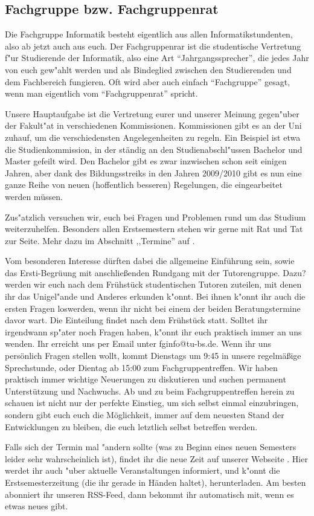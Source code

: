 \subsection{Fachgruppe bzw. Fachgruppenrat}

Die Fachgruppe Informatik besteht eigentlich aus allen 
Informatikstundenten, also ab jetzt auch aus euch. Der Fachgruppenrar 
ist die studentische Vertretung f"ur Studierende der Informatik, also 
eine Art "`Jahrgangssprecher"', die jedes Jahr von euch gew"ahlt werden 
und als Bindeglied zwischen den Studierenden und dem Fachbereich 
fungieren. Oft wird aber auch einfach "`Fachgruppe"' gesagt, wenn man 
eigentlich vom "`Fachgruppenrat"' spricht.

Unsere Hauptaufgabe ist die Vertretung eurer und unserer Meinung 
gegen"uber der Fakult"at in verschiedenen Kommissionen. Kommissionen 
gibt es an der Uni zuhauf, um die verschiedensten Angelegenheiten zu 
regeln. Ein Beispiel ist etwa die Studienkommission, in der ständig 
an den Studienabschl"ussen Bachelor und Master gefeilt wird. Den Bachelor 
gibt es zwar inzwischen schon seit einigen Jahren, aber dank des 
Bildungsstreiks in den Jahren 2009/2010 gibt es nun eine ganze Reihe 
von neuen (hoffentlich besseren) Regelungen, die eingearbeitet werden 
müssen.

Zus"atzlich versuchen wir, euch bei Fragen und Problemen rund um das 
Studium weiterzuhelfen. Besonders allen Erstsemestern stehen wir 
gerne mit Rat und Tat zur Seite.  Mehr dazu im Abschnitt ,,Termine'' auf
\pageref{termine}.

Vom besonderen Interesse dürften dabei die allgemeine Einführung sein,
sowie das Ersti-Begrüung mit anschließenden Rundgang mit der
Tutorengruppe.
Dazu? werden wir euch nach dem Frühstück studentischen 
Tutoren zuteilen, mit denen ihr das Unigel"ande und Anderes erkunden 
k"onnt. Bei ihnen k"onnt ihr auch die ersten Fragen loswerden, wenn 
ihr nicht bei einem der beiden Beratungstermine davor wart.
Die Einteilung findet nach dem Frühstück statt.
Solltet ihr irgendwann sp"ater noch Fragen haben, k"onnt ihr euch 
praktisch immer an uns wenden. Ihr erreicht uns per Email unter 
fginfo@tu-bs.de. Wenn ihr uns persönlich Fragen stellen wollt, kommt 
Dienstags um 9:45 in unsere regelmäßige Sprechstunde, oder Dientag ab 
15:00 zum Fachgruppentreffen. Wir haben praktisch immer wichtige 
Neuerungen zu diskutieren und suchen permanent Unterstützung und 
Nachwuchs. Ab und zu beim Fachgruppentreffen herein zu schauen ist 
nicht nur der perfekte Einstieg, um sich selbst einmal einzubringen, 
sondern gibt euch euch die Möglichkeit, immer auf dem neuesten Stand 
der Entwicklungen zu bleiben, die euch letztlich selbst betreffen werden.

Falls sich der Termin mal "andern sollte (was zu Beginn eines neuen 
Semesters leider sehr wahrscheinlich ist), findet ihr die neue Zeit 
auf unserer Webseite \mbox{}. Hier 
werdet ihr auch "uber aktuelle Veranstaltungen informiert, und k"onnt 
die Erstsemesterzeitung (die ihr gerade in Händen haltet), herunterladen. 
Am besten abonniert ihr unseren RSS-Feed, dann bekommt ihr automatisch 
mit, wenn es etwas neues gibt.
